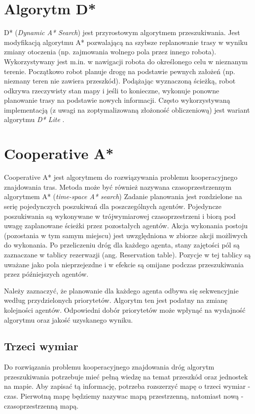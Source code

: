 \section{Algorytm D*}
\label{ch:dstar}
D* ({\it Dynamic A* Search}) jest przyrostowym algorytmem przeszukiwania. Jest modyfikacją algorytmu A* pozwalającą na szybsze replanowanie trasy w wyniku zmiany otoczenia (np. zajmowania wolnego pola przez innego robota). Wykorzystywany jest m.in. w nawigacji robota do określonego celu w nieznanym terenie. Początkowo robot planuje drogę na podstawie pewnych założeń (np. nieznany teren nie zawiera przeszkód). Podążając wyznaczoną ścieżką, robot odkrywa rzeczywisty stan mapy i jeśli to konieczne, wykonuje ponowne planowanie trasy na podstawie nowych informacji.
Często wykorzystywaną implementacją (z uwagi na zoptymalizowaną złożoność obliczeniową) jest wariant algorytmu {\it D* Lite} \cite{dstarlite}.

\section{Cooperative A*}
Cooperative A* jest algorytmem do rozwiązywania problemu kooperacyjnego znajdowania tras.
Metoda może być również nazywana czasoprzestrzennym algorytmem A* ({\it time-space A* search})
Zadanie planowania jest rozdzielone na serię pojedynczych poszukiwań dla poszczególnych agentów.
Pojedyncze poszukiwania są wykonywane w trójwymiarowej czasoprzestrzeni i biorą pod uwagę zaplanowane ścieżki przez pozostałych agentów.
Akcja wykonania postoju (pozostania w tym samym miejscu) jest uwzględniona w zbiorze akcji możliwych do wykonania.
Po przeliczeniu dróg dla każdego agenta, stany zajętości pól są zaznaczane w tablicy rezerwazji (ang. Reservation table).
Pozycje w tej tablicy są uważane jako pola nieprzejezdne i w efekcie są omijane podczas przeszukiwania przez późniejszych agentów. \cite{cooppath}

Należy zaznaczyć, że planowanie dla każdego agenta odbywa się sekwencyjnie według przydzielonych priorytetów.
Algorytm ten jest podatny na zmianę kolejności agentów. Odpowiedni dobór priorytetów może wpłynąć na wydajność algorytmu oraz jakość uzyskanego wyniku.

\subsection{Trzeci wymiar}
Do rozwiązania problemu kooperacyjnego znajdowania dróg algorytm przeszukiwania potrzebuje mieć pełną wiedzę na temat przeszkód oraz jednostek na mapie.
Aby zapisać tą informację, potrzeba rozszerzyć mapę o trzeci wymiar - czas. 
Pierwotną mapę będziemy nazywac mapą przestrzenną, natomiast nową - czasoprzestrzenną mapą. \cite{cooppath}

